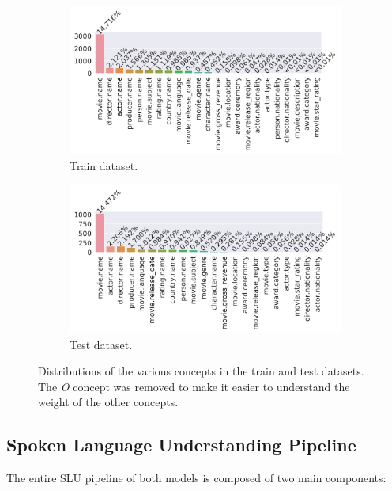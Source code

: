 \documentclass[11pt,a4paper]{article}
\begin{document}
\begin{figure}
	\begin{subfigure}[b]{0.5\linewidth}
		\includegraphics[width=\linewidth]{img/train-concepts-distribution}
		\caption{Train dataset.}
	\end{subfigure}
	\begin{subfigure}[b]{0.5\linewidth}
	\includegraphics[width=\textwidth]{img/test-concepts-distribution}
	\caption{Test dataset.}
	\end{subfigure}
	\caption{Distributions of the various concepts in the train and test datasets. The \textit{O} concept was removed to make it easier to understand the weight of the other concepts.}
	\label{fig:concept-distribution}
\end{figure}

\subsection{Spoken Language Understanding Pipeline}
The entire SLU pipeline of both models is composed of two main components:
\end{document}

